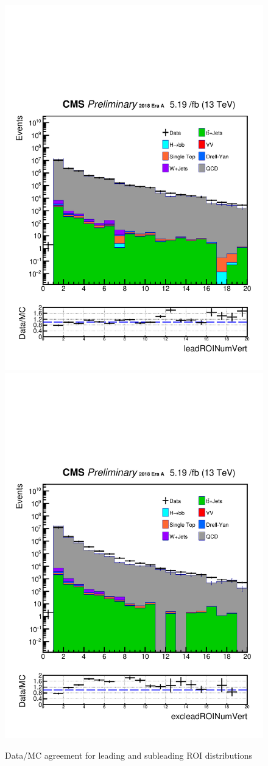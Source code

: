 \begin{figure}[h!]
  \caption{Data/MC agreement for leading and subleading ROI distributions}
  \label{fig:DataMCscore3}
  \centering
  \includegraphics[width=0.57\linewidth]{figs/Data_log_AnalysisNote_MS-15_ctauS-10_leadROINumVert.pdf}
  \includegraphics[width=0.57\linewidth]{figs/Data_log_AnalysisNote_MS-15_ctauS-10_excleadROINumVert.pdf}
\end{figure}


